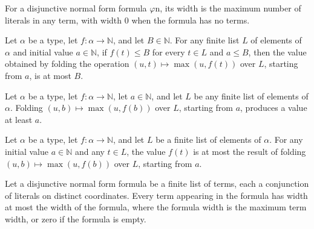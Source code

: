 \begin{definition}
\label{FABL.DNFFormula.width}
\leanok
{}
For a disjunctive normal form formula $\varphi$n, its width is the maximum number of literals
in any term, with width $0$ when the formula has no terms.
\end{definition}

\begin{theorem}
\label{FABL.DNFFormula.foldl_max_le}
\leanok
{}
Let $\alpha$ be a type, let $f : \alpha \to \mathbb{N}$, and let $B \in \mathbb{N}$. For
any finite list $L$ of elements of $\alpha$ and initial value $a \in \mathbb{N}$, if
$f(t) \le B$ for every $t \in L$ and $a \le B$, then the value obtained by folding the
operation $(u,t) \mapsto \max(u,f(t))$ over $L$, starting from $a$, is at most $B$.
\end{theorem}

\begin{theorem}
\label{FABL.DNFFormula.le_foldl_max_aux}
\leanok
{}
Let $\alpha$ be a type, let $f : \alpha \to \mathbb{N}$, let $a \in \mathbb{N}$, and let
$L$ be any finite list of elements of $\alpha$. Folding $(u,b) \mapsto \max(u,f(b))$
over $L$, starting from $a$, produces a value at least $a$.
\end{theorem}

\begin{theorem}
\label{FABL.DNFFormula.le_foldl_max}
\leanok
{}
Let $\alpha$ be a type, let $f : \alpha \to \mathbb{N}$, and let $L$ be a finite list of
elements of $\alpha$. For any initial value $a \in \mathbb{N}$ and any $t \in L$, the
value $f(t)$ is at most the result of folding $(u,b) \mapsto \max(u,f(b))$ over $L$,
starting from $a$.
\end{theorem}

\begin{theorem}
\label{FABL.DNFFormula.width_le_of_mem}
\leanok
{}
Let a disjunctive normal form formula be a finite list of terms, each a conjunction of
literals on distinct coordinates. Every term appearing in the formula has width at most
the width of the formula, where the formula width is the maximum term width, or zero if
the formula is empty.
\end{theorem}

